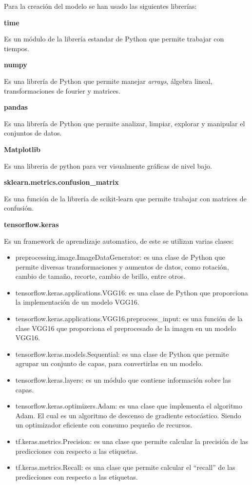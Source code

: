         Para la creación del modelo se han usado las siguientes librerías:

        \textbf{time}
        
            Es un módulo de la librería estandar de Python que permite trabajar con tiempos.

        \textbf{numpy}
        
            Es una librería de Python que permite manejar \textit{arrays}, álgebra lineal, transformaciones de fourier y matrices.

        \textbf{pandas}
        
            Es una librería de Python que permite analizar, limpiar, explorar y manipular el conjuntos de datos.

        \textbf{Matplotlib}
        
            Es una libreria de python para ver visualmente gráficas de nivel bajo.

        \textbf{sklearn.metrics.confusion\_matrix}
        
             Es una función de la librería de scikit-learn que permite trabajar con matrices de confusión.

        \textbf{tensorflow.keras}
        
            Es un framework de aprendizaje automatico, de este se utilizan varias clases: 
            \begin{itemize}
                \item preprocessing.image.ImageDataGenerator: es una clase de Python que permite diversas transformaciones y aumentos de datos, como rotación, cambio de tamaño, recorte, cambio de brillo, entre otros.
                \item tensorflow.keras.applications.VGG16: es una clase de Python que proporciona la implementación de un modelo VGG16.
                \item tensorflow.keras.applications.VGG16.preprocess\_input: es una función de la clase VGG16 que proporciona el preprocesado de la imagen en un modelo VGG16.
                \item tensorflow.keras.models.Sequential: es una clase de Python que permite agrupar un conjunto de capas, para convertirlas en un modelo.
                \item tensorflow.keras.layers: es un módulo que contiene información sobre las capas.
                \item tensorflow.keras.optimizers.Adam: es una clase que implementa el algoritmo Adam. El cual es un algoritmo de descenso de gradiente estocástico. Siendo un optimizador eficiente con consumo pequeño de recursos.
                \item tf.keras.metrics.Precision: es una clase que permite calcular la precisión de las predicciones con respecto a las etiquetas.
                \item tf.keras.metrics.Recall: es una clase que permite calcular el ``recall'' de las predicciones con respecto a las etiquetas.  
            \end{itemize}
            
